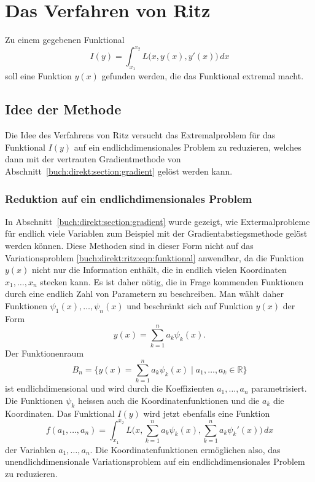 %
%
%
\section{Das Verfahren von Ritz
\label{buch:direkt:section:ritz}}
Zu einem gegebenen Funktional
\begin{equation}
I(y)
=
\int_{x_1}^{x_2}
L\bigl(x,y(x),y'(x)\bigr)
\,dx
\label{buch:direkt:ritz:eqn:funktional}
\end{equation}
soll eine Funktion $y(x)$ gefunden werden, die das Funktional
extremal macht.

%
%
\subsection{Idee der Methode}
Die Idee des Verfahrens von Ritz
%
%
versucht das Extremalproblem für das Funktional $I(y)$ auf ein
endlichdimensionales Problem zu reduzieren, welches dann mit der
vertrauten Gradientmethode von
Abschnitt~\ref{buch:direkt:section:gradient} gelöst werden kann.

%
%
\subsubsection{Reduktion auf ein endlichdimensionales Problem}
In Abschnitt~\ref{buch:direkt:section:gradient} wurde gezeigt, wie 
Extermalprobleme für endlich viele Variablen zum Beispiel mit der
Gradientabstiegsmethode gelöst werden können.
Diese Methoden sind in dieser Form nicht auf das Variationsproblem
\eqref{buch:direkt:ritz:eqn:funktional} anwendbar, da die Funktion
$y(x)$ nicht nur die Information enthält, die in endlich vielen
Koordinaten $x_1,\dots,x_n$ stecken kann.
Es ist daher nötig, die in Frage kommenden Funktionen durch eine
endlich Zahl von Parametern zu beschreiben.
Man wählt daher Funktionen $\psi_1(x),\dots,\psi_n(x)$ und beschränkt
sich auf Funktion $y(x)$ der Form
\[
y(x)
=
\sum_{k=1}^n
a_k \psi_k(x).
\]
Der Funktionenraum 
\[
B_n
=
\biggl\{
y(x)
=
\sum_{k=1}^n a_k\psi_k(x)
\;
\bigg|
\;
a_1,\dots,a_k\in\mathbb{R}
\biggr\}
\]
ist endlichdimensional und wird durch die Koeffizienten $a_1,\dots,a_n$
parametrisiert.
Die Funktionen $\psi_k$ heissen auch die Koordinatenfunktionen und die
$a_k$ die Koordinaten.
Das Funktional $I(y)$ wird jetzt ebenfalls eine Funktion
\[
f(a_1,\dots,a_n)
=
\int_{x_1}^{x_2}
L\biggl(x,
\sum_{k=1}^n a_k\psi_k(x),
\sum_{k=1}^n a_k\psi_k'(x)
\biggr)
\,dx
\]
der Variablen $a_1,\dots,a_n$.
Die Koordinatenfunktionen ermöglichen also, das unendlichdimensionale
Variationsproblem auf ein endlichdimensionales Problem zu reduzieren.

